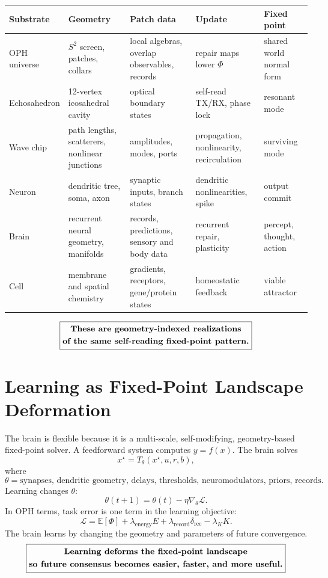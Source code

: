 \documentclass[11pt]{article}
\theoremstyle{remark}
\theoremstyle{plain}
\newcommand{\E}{\mathbb E}
\newcommand{\rec}{\mathrm{rec}}
\begin{document}
\begin{small}
\begin{longtable}{@{}L{0.13\textwidth}L{0.21\textwidth}L{0.21\textwidth}L{0.17\textwidth}L{0.13\textwidth}@{}}
\toprule
\textbf{Substrate} & \textbf{Geometry} & \textbf{Patch data} & \textbf{Update} & \textbf{Fixed point} \\
\midrule
\endhead
OPH universe & \(S^2\) screen, patches, collars & local algebras, overlap observables, records & repair maps lower \(\Phi\) & shared world normal form \\
Echosahedron & 12-vertex icosahedral cavity & optical boundary states & self-read TX/RX, phase lock & resonant mode \\
Wave chip & path lengths, scatterers, nonlinear junctions & amplitudes, modes, ports & propagation, nonlinearity, recirculation & surviving mode \\
Neuron & dendritic tree, soma, axon & synaptic inputs, branch states & dendritic nonlinearities, spike & output commit \\
Brain & recurrent neural geometry, manifolds & records, predictions, sensory and body data & recurrent repair, plasticity & percept, thought, action \\
Cell & membrane and spatial chemistry & gradients, receptors, gene/protein states & homeostatic feedback & viable attractor \\
\bottomrule
\end{longtable}
\end{small}

\[
\boxed{
\begin{gathered}
\text{\bfseries These are geometry-indexed realizations}\\
\text{\bfseries of the same self-reading fixed-point pattern.}
\end{gathered}
}
\]

\section{Learning as Fixed-Point Landscape Deformation}

The brain is flexible because it is a multi-scale, self-modifying, geometry-based fixed-point solver. A feedforward system computes \(y=f(x)\). The brain solves
\[
x^\star=T_\theta(x^\star,u,r,b),
\]
where
\[
\theta=
\text{synapses, dendritic geometry, delays, thresholds, neuromodulators, priors, records}.
\]
Learning changes \(\theta\):
\[
\theta(t+1)=\theta(t)-\eta\nabla_\theta\mathcal L.
\]
In OPH terms, task error is one term in the learning objective:
\[
\boxed{
\mathcal L
=
\E[\Phi]
+
\lambda_{\mathrm{energy}}E
+
\lambda_{\mathrm{record}}\delta_{\rec}
-
\lambda_K K.
}
\]
The brain learns by changing the geometry and parameters of future convergence.
\[
\boxed{
\begin{gathered}
\text{\bfseries Learning deforms the fixed-point landscape}\\
\text{\bfseries so future consensus becomes easier, faster, and more useful.}
\end{gathered}
}
\]
\end{document}
